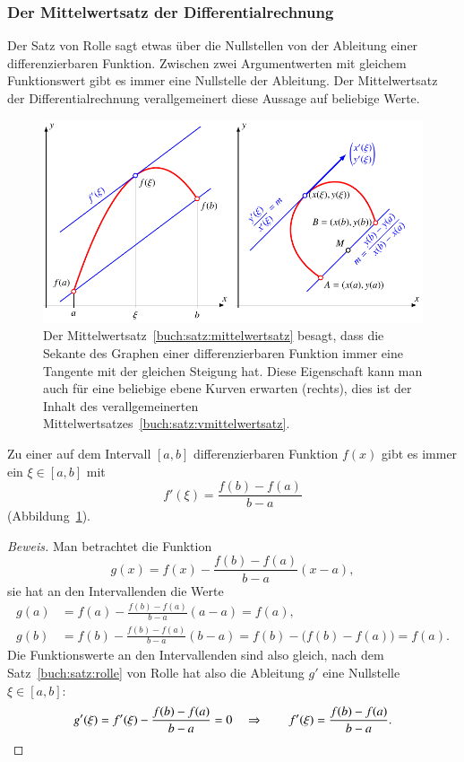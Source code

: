 \subsubsection{Der Mittelwertsatz der Differentialrechnung}
Der Satz von Rolle sagt etwas über die Nullstellen von der Ableitung
einer differenzierbaren Funktion.
Zwischen zwei Argumentwerten mit gleichem Funktionswert gibt es immer
eine Nullstelle der Ableitung.
Der Mittelwertsatz der Differentialrechnung verallgemeinert diese
Aussage auf beliebige Werte.

\begin{figure}
\centering
\includegraphics{chapters/30-interpolation/figures/mittelwertsatz.pdf}
\caption{Der Mittelwertsatz~\ref{buch:satz:mittelwertsatz} besagt, dass
die Sekante des Graphen einer differenzierbaren Funktion immer eine
Tangente mit der gleichen Steigung hat.
Diese Eigenschaft kann man auch für eine beliebige ebene Kurven
erwarten (rechts), dies ist der Inhalt des verallgemeinerten
Mittelwertsatzes~\ref{buch:satz:vmittelwertsatz}.
\label{buch:polynome:figure:mittelwertsatz}}
\end{figure}

\begin{satz}[Mittelwertsatz]
\label{buch:satz:mittelwertsatz}
Zu einer auf dem Intervall $[a,b]$ differenzierbaren Funktion $f(x)$ gibt
es immer ein $\xi\in[a,b]$ mit
\[
f'(\xi) = \frac{f(b)-f(a)}{b-a}
\]
(Abbildung~\ref{buch:polynome:figure:mittelwertsatz}).
\end{satz}

\begin{proof}[Beweis]
Man betrachtet die Funktion 
\[
g(x) = f(x) - \frac{f(b)-f(a)}{b-a}(x-a),
\]
sie hat an den Intervallenden die Werte
\begin{align*}
g(a) &= f(a) - \frac{f(b)-f(a)}{b-a}(a-a)=f(a),
\\
g(b) &= f(b) - \frac{f(b)-f(a)}{b-a}(b-a) = f(b) - \bigl(f(b)-f(a)\bigr) = f(a).
\end{align*}
Die Funktionswerte an den Intervallenden sind also gleich,
nach dem Satz~\ref{buch:satz:rolle} von Rolle hat also
die Ableitung $g'$ eine Nullstelle $\xi\in[a,b]$:
\[
g'(\xi) = f'(\xi) - \frac{f(b)-f(a)}{b-a} = 0
\quad
\Rightarrow
\qquad
f'(\xi) = \frac{f(b)-f(a)}{b-a}.
\qedhere
\]
\end{proof}

